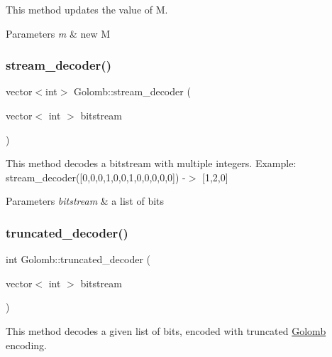 This method updates the value of \textquotesingle{}M\textquotesingle{}.


\begin{DoxyParams}{Parameters}
{\em m} & new M \\
\hline
\end{DoxyParams}
\mbox{\label{classGolomb_a5116ab2ba314226543257204c66ced62}} 
\subsubsection{\texorpdfstring{stream\+\_\+decoder()}{stream\_decoder()}}
{\footnotesize\ttfamily vector$<$int$>$ Golomb\+::stream\+\_\+decoder (\begin{DoxyParamCaption}\item[{vector$<$ int $>$}]{bitstream }\end{DoxyParamCaption})\hspace{0.3cm}{\ttfamily [inline]}}

This method decodes a bitstream with multiple integers. Example\+: stream\+\_\+decoder(\mbox{[}0,0,0,1,0,0,1,0,0,0,0,0\mbox{]}) -\/$>$ \mbox{[}1,2,0\mbox{]}


\begin{DoxyParams}{Parameters}
{\em bitstream} & a list of bits \\
\hline
\end{DoxyParams}
\mbox{\label{classGolomb_a395b68ea88abe771d02ba62aff2c559a}} 
\subsubsection{\texorpdfstring{truncated\+\_\+decoder()}{truncated\_decoder()}}
{\footnotesize\ttfamily int Golomb\+::truncated\+\_\+decoder (\begin{DoxyParamCaption}\item[{vector$<$ int $>$}]{bitstream }\end{DoxyParamCaption})\hspace{0.3cm}{\ttfamily [inline]}}

This method decodes a given list of bits, encoded with truncated \hyperlink{classGolomb}{Golomb} encoding.


